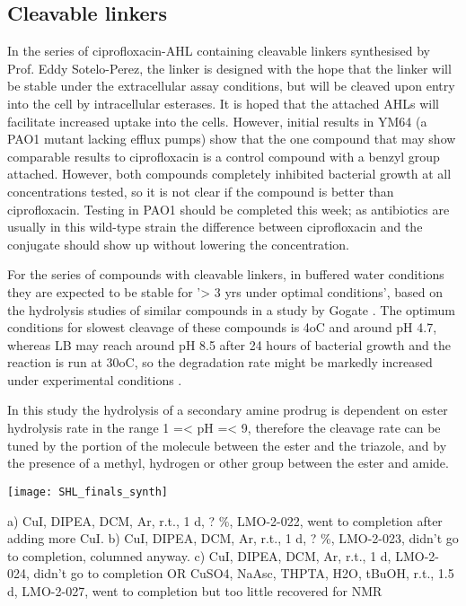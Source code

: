 \subsection{Cleavable linkers}

In the series of ciprofloxacin-AHL containing cleavable linkers synthesised by Prof. Eddy Sotelo-Perez, the linker is designed with the hope that the linker will be stable under the extracellular assay conditions, but will be cleaved upon entry into the cell by intracellular esterases. It is hoped that the attached AHLs will facilitate increased uptake into the cells. However, initial results in YM64 (a PAO1 mutant lacking efflux pumps) show that the one compound that may show comparable results to ciprofloxacin is a control compound with a benzyl group attached. However, both compounds completely inhibited bacterial growth at all concentrations tested, so it is not clear if the compound is better than ciprofloxacin. Testing in PAO1 should be completed this week; as antibiotics are usually in this wild-type strain the difference between ciprofloxacin and the conjugate should show up without lowering the concentration. 

For the series of compounds with cleavable linkers, in buffered water conditions they are expected to be stable  for '> 3 yrs under optimal conditions', based on the hydrolysis studies of similar compounds in a study by Gogate \cite{Gogate1987}. The optimum conditions for slowest cleavage of these compounds is 4oC and around pH 4.7, whereas LB may reach around pH 8.5\cite{Martin} after 24 hours of bacterial growth and the reaction is run at 30oC, so the degradation rate might be markedly increased under experimental conditions \cite{maths}. 

In this study the hydrolysis of a secondary amine prodrug is dependent on ester hydrolysis rate in the range 1 =< pH =< 9, therefore the cleavage rate can be tuned by the portion of the molecule between the ester and the triazole, and by the presence of a methyl, hydrogen or other group between the ester and amide\cite{?}. 

\begin{scheme}[H]
	\begin{center}
		\texttt{[image: SHL\_finals\_synth]}
		\caption{a) CuI, DIPEA, DCM, Ar, r.t., 1 d, ? \%, LMO-2-022, went to completion after adding more CuI.
			b) CuI, DIPEA, DCM, Ar, r.t., 1 d, ? \%, LMO-2-023, didn't go to completion, columned anyway.
			c) CuI, DIPEA, DCM, Ar, r.t., 1 d, LMO-2-024, didn't go to completion
			OR CuSO4, NaAsc, THPTA, H2O, tBuOH, r.t., 1.5 d, LMO-2-027, went to completion but too little recovered for NMR\label{sch:}}
	\end{center}
\end{scheme}


